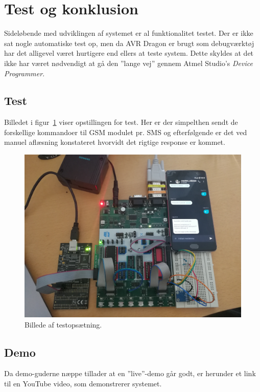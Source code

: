 \section{Test og konklusion}

Sideløbende med udviklingen af systemet er al funktionalitet testet. Der er ikke sat nogle automatiske test op, men da AVR Dragon er brugt som debugværktøj har det alligevel været hurtigere end ellers at teste system. Dette skyldes at det ikke har været nødvendigt at gå den ''lange vej'' gennem Atmel Studio's \textit{Device Programmer}.

\subsection{Test}

Billedet i figur~\ref{fig:testsetup} viser opstillingen for test. Her er der simpelthen sendt de forskellige kommandoer til GSM modulet pr. SMS og efterfølgende er det ved manuel aflæsning konstateret hvorvidt det rigtige response er kommet.

\begin{figure}[h]
	\centering
	\includegraphics[width=\linewidth]{figs/test_setup}
	\caption{Billede af testopsætning.}
	\label{fig:testsetup}
\end{figure}

\subsection{Demo}
Da demo-guderne næppe tillader at en ''live''-demo går godt, er herunder et link til en YouTube video, som demonstrerer systemet.

